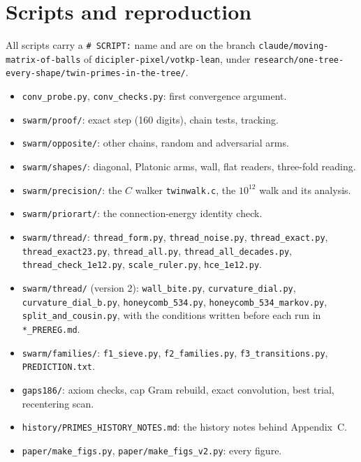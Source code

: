 \documentclass[11pt]{article}
\theoremstyle{definition}
\theoremstyle{remark}
\begin{document}
\section{Scripts and reproduction}
\sloppy
All scripts carry a \texttt{\# SCRIPT:} name and are on the branch \texttt{claude/moving-matrix-of-balls} of \texttt{dicipler-pixel/votkp-lean}, under \texttt{research/one-tree-every-shape/twin-primes-in-the-tree/}.
\begin{itemize}
\item \texttt{conv\_probe.py}, \texttt{conv\_checks.py}: first convergence argument.
\item \texttt{swarm/proof/}: exact step (160 digits), chain tests, tracking.
\item \texttt{swarm/opposite/}: other chains, random and adversarial arms.
\item \texttt{swarm/shapes/}: diagonal, Platonic arms, wall, flat readers, three-fold reading.
\item \texttt{swarm/precision/}: the $C$ walker \texttt{twinwalk.c}, the $10^{12}$ walk and its analysis.
\item \texttt{swarm/priorart/}: the connection-energy identity check.
\item \texttt{swarm/thread/}: \texttt{thread\_form.py}, \texttt{thread\_noise.py}, \texttt{thread\_exact.py}, \texttt{thread\_exact23.py}, \texttt{thread\_all.py}, \texttt{thread\_all\_decades.py}, \texttt{thread\_check\_1e12.py}, \texttt{scale\_ruler.py}, \texttt{hce\_1e12.py}.
\item \texttt{swarm/thread/} (version 2): \texttt{wall\_bite.py}, \texttt{curvature\_dial.py}, \texttt{curvature\_dial\_b.py}, \texttt{honeycomb\_534.py}, \texttt{honeycomb\_534\_markov.py}, \texttt{split\_and\_cousin.py}, with the conditions written before each run in \texttt{*\_PREREG.md}.
\item \texttt{swarm/families/}: \texttt{f1\_sieve.py}, \texttt{f2\_families.py}, \texttt{f3\_transitions.py}, \texttt{PREDICTION.txt}.
\item \texttt{gaps186/}: axiom checks, cap Gram rebuild, exact convolution, best trial, recentering scan.
\item \texttt{history/PRIMES\_HISTORY\_NOTES.md}: the history notes behind Appendix~C.
\item \texttt{paper/make\_figs.py}, \texttt{paper/make\_figs\_v2.py}: every figure.
\end{itemize}
\end{document}
